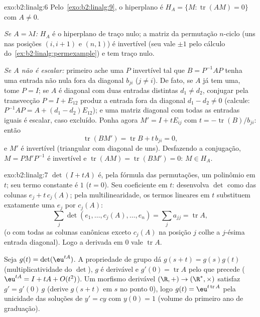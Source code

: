 \begin{solution}{exo:b2:linalg:6}
Pelo~\cref{exo:b2:linalg:9}, o hiperplano é $H_A = \{M :
\operatorname{tr}(AM) = 0\}$ com $A \neq 0$.

\emph{Se $A = \lambda I$:} $H_A$ é o hiperplano de traço nulo; a
matriz da permutação $n$-ciclo (uns nas posições $(i, i+1)$
e $(n, 1)$) é invertível (seu  vale $\pm 1$ pelo
cálculo do~\cref{ex:b2:linalg:permexample}) e tem traço nulo.

\emph{Se $A$ não é escalar:} primeiro ache uma $P$ invertível tal que
$B = P^{-1}AP$ tenha uma entrada não nula fora da diagonal $b_{ji}$ ($j \neq
i$). De fato, se $A$ já tem uma, tome $P = I$; se $A$ é
diagonal com duas entradas distintas $d_1 \neq d_2$, conjugar pela
transvecção $P = I + E_{12}$ produz a entrada fora da diagonal
$d_1 - d_2 \neq 0$ (calcule: $P^{-1}AP = A + (d_1 - d_2)E_{12}$);
e uma matriz diagonal com todas as entradas iguais é
escalar, caso excluído. Ponha agora $M' = I + tE_{ij}$ com $t =
-\operatorname{tr}(B)/b_{ji}$: então
\[
\operatorname{tr}(BM') = \operatorname{tr} B + t\,b_{ji} = 0,
\]
e $M'$ é invertível (triangular com diagonal de uns). Desfazendo a
conjugação, $M = PM'P^{-1}$ é invertível e
$\operatorname{tr}(AM) = \operatorname{tr}(BM') = 0$: $M \in H_A$.
\end{solution}

\begin{solution}{exo:b2:linalg:7}
$\det(I + tA)$ é, pela fórmula das permutações, um polinômio em $t$;
seu termo constante é $1$ ($t = 0$). Seu coeficiente em $t$: desenvolva
$\det$ como  das colunas $e_j + t\,c_j(A)$; pela
multilinearidade, os termos lineares em $t$ substituem exatamente uma $e_j$ por
$c_j(A)$:
\[
\sum_{j} \det(e_1, \dots, c_j(A), \dots, e_n)
= \sum_j a_{jj} = \operatorname{tr} A ,
\]
(o  com todas as colunas canônicas exceto $c_j(A)$ na posição
$j$ colhe a $j$-ésima entrada diagonal). Logo a derivada em $0$ vale
$\operatorname{tr} A$.

Seja $g(t) = \det(\eu^{tA})$. A propriedade de grupo dá $g(s + t) =
g(s)g(t)$ (multiplicatividade do $\det$), $g$ é derivável e
$g'(0) = \operatorname{tr} A$ pelo que precede ($\eu^{tA} = I + tA +
O(t^2)$). Um morfismo derivável $(\R, +) \to (\R^*, \times)$
satisfaz $g' = g'(0)\,g$ (derive $g(s+t)$ em $s$ no ponto $0$), logo
$g(t) = \eu^{t\operatorname{tr} A}$ pela unicidade das soluções
de $y' = cy$ com $y(0) = 1$ (volume do primeiro ano de graduação).
\end{solution}

